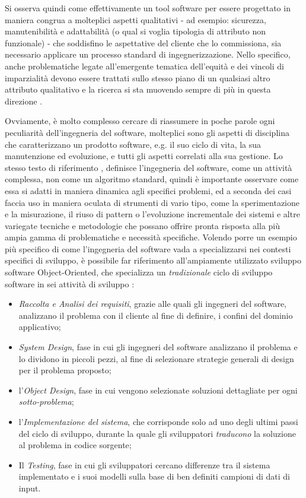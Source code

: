 Si osserva quindi come effettivamente un tool software per essere progettato in maniera congrua a molteplici aspetti qualitativi - ad esempio: sicurezza, manutenibilità e adattabilità (o qual si voglia tipologia di attributo non funzionale) - che soddisfino le aspettative del cliente che lo commissiona, sia necessario applicare un processo standard di ingegnerizzazione. Nello specifico, anche problematiche legate all'emergente tematica dell'equità e dei vincoli di imparzialità devono essere trattati sullo stesso piano di un qualsiasi altro attributo qualitativo e la ricerca si sta muovendo sempre di più in questa direzione \cite{brun2018software}.

Ovviamente, è molto complesso cercare di riassumere in poche parole ogni peculiarità dell'ingegneria del software, molteplici sono gli aspetti di disciplina che caratterizzano un prodotto software, e.g. il suo ciclo di vita, la sua manutenzione ed evoluzione, e tutti gli aspetti correlati alla sua gestione. Lo stesso testo di riferimento \cite{Bruegge2009ObjectOrientedSE}, definisce l'ingegneria del software, come un attività complessa, non come un algoritmo standard, quindi è importante osservare come essa si adatti in maniera dinamica agli specifici problemi, ed a seconda dei casi faccia uso in maniera oculata di strumenti di vario tipo, come la sperimentazione e la misurazione, il riuso di pattern o l'evoluzione incrementale dei sistemi \cite{Bruegge2009ObjectOrientedSE} e altre variegate tecniche e metodologie che possano offrire pronta risposta alla più ampia gamma di problematiche e necessità specifiche. Volendo porre un esempio più specifico di come l'ingegneria del software vada a specializzarsi nei contesti specifici di sviluppo, è possibile far riferimento all'ampiamente utilizzato sviluppo software Object-Oriented, che specializza un \emph{tradizionale} ciclo di sviluppo software in sei attività di sviluppo \cite{Bruegge2009ObjectOrientedSE}: 

\begin{itemize}
    \item  \emph{Raccolta e Analisi dei requisiti}, grazie alle quali gli ingegneri del software, analizzano il problema con il cliente al fine di definire, i confini del dominio applicativo;
    \item \emph{System Design}, fase in cui gli ingegneri del software analizzano il problema e lo dividono in piccoli pezzi, al fine di selezionare strategie generali di design per il problema proposto;
    \item l'\emph{Object Design}, fase in cui vengono selezionate soluzioni dettagliate per ogni \emph{sotto-problema};
    \item l'\emph{Implementazione del sistema}, che corrisponde solo ad uno degli ultimi passi del ciclo di sviluppo, durante la quale gli sviluppatori \emph{traducono} la soluzione al problema in codice sorgente;
    \item Il \emph{Testing}, fase in cui gli sviluppatori cercano differenze tra il sistema implementato e i suoi modelli sulla base di ben definiti campioni di dati di input.
\end{itemize}

